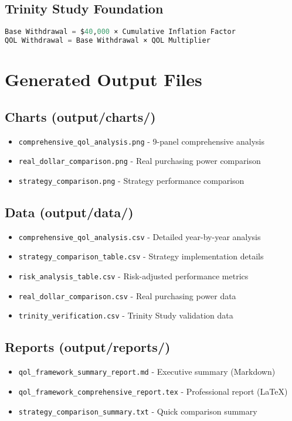 \documentclass[11pt,letterpaper]{article}
\begin{document}
\subsection{Trinity Study Foundation}
\begin{lstlisting}[language=Python, caption=Trinity Study Implementation]
Base Withdrawal = $40,000 × Cumulative Inflation Factor
QOL Withdrawal = Base Withdrawal × QOL Multiplier
\end{lstlisting}

\section{Generated Output Files}

\subsection{Charts (output/charts/)}
\begin{itemize}
    \item \texttt{comprehensive\_qol\_analysis.png} - 9-panel comprehensive analysis
    \item \texttt{real\_dollar\_comparison.png} - Real purchasing power comparison
    \item \texttt{strategy\_comparison.png} - Strategy performance comparison
\end{itemize}

\subsection{Data (output/data/)}
\begin{itemize}
    \item \texttt{comprehensive\_qol\_analysis.csv} - Detailed year-by-year analysis
    \item \texttt{strategy\_comparison\_table.csv} - Strategy implementation details
    \item \texttt{risk\_analysis\_table.csv} - Risk-adjusted performance metrics
    \item \texttt{real\_dollar\_comparison.csv} - Real purchasing power data
    \item \texttt{trinity\_verification.csv} - Trinity Study validation data
\end{itemize}

\subsection{Reports (output/reports/)}
\begin{itemize}
    \item \texttt{qol\_framework\_summary\_report.md} - Executive summary (Markdown)
    \item \texttt{qol\_framework\_comprehensive\_report.tex} - Professional report (LaTeX)
    \item \texttt{strategy\_comparison\_summary.txt} - Quick comparison summary
\end{itemize}
\end{document}
